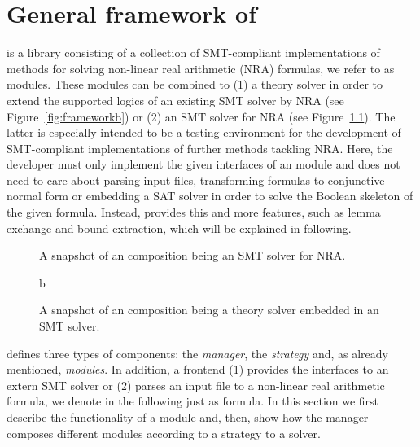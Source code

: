 \chapter{General framework of \smtrat}
\label{chapter:generalframework}
\smtrat is a \Cpp library consisting of a collection of
SMT-compliant implementations of methods for solving non-linear real
arithmetic (NRA) formulas, we refer to as modules. These modules can be 
combined to (1) a theory solver in order to extend the supported logics of an
existing SMT solver by NRA (see Figure~\ref{fig:frameworkb}) or (2) an SMT 
solver for NRA (see Figure~\ref{fig:frameworka}). The latter is 
especially intended to be a testing environment for the development 
of SMT-compliant implementations of further methods tackling NRA. Here,
the developer must only implement the given interfaces of an \smtrat 
module and does not need to care about parsing input files, transforming
formulas to conjunctive normal form or embedding a SAT solver in order
to solve the Boolean skeleton of the given formula. Instead, \smtrat
provides this and more features, such as lemma exchange and bound
extraction, which will be explained in following.

\begin{figure}[ht]
\caption{A snapshot of an \smtrat composition being an SMT solver for NRA.}
\begin{center}

\end{center}
\label{fig:frameworka}
\end{figure}

\begin{figure}[ht]
\caption{A snapshot of an \smtrat composition being a theory solver embedded in an SMT solver.}
\begin{center}

\end{center}
\label{fig:framework}b
\end{figure}

\smtrat defines three types of components: the \emph{manager}, the \emph{strategy} and, as already mentioned, \emph{modules}. 
In addition, a frontend (1) provides the interfaces to an extern SMT 
solver or (2) parses an input file to a non-linear real arithmetic 
formula, we denote in the following just as formula.
In this section we first describe the functionality of a module and,
then, show how the manager composes different modules according to a
strategy to a solver.

